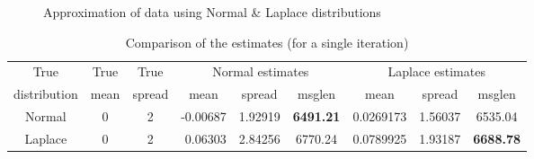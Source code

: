 \documentclass[wcp]{jmlr}
\begin{document}
\begin{figure}[!htb]
  \centering
    \hspace{0.5cm}
    \caption{Approximation of data using Normal \& Laplace distributions}
    \label{fig:data_approximation}
\end{figure}

\begin{table}[h]
\centering
\caption{Comparison of the estimates (for a single iteration)}
\label{tab:comparison_estimates}
\begin{tabular}{|c|c|c|c|c|c|c|c|c|}
\hline
True & True & True & \multicolumn{3}{c|}{Normal estimates} & \multicolumn{3}{c|}{Laplace estimates} \\ \cline{4-9} 
distribution & mean & spread & mean & spread & msglen & mean & spread & msglen \\ \hline 
Normal & 0 & 2 & \multicolumn{1}{|r|}{-0.00687} & 1.92919 & \textbf{6491.21} & 0.0269173 & 1.56037 & 6535.04 \\ \hline
Laplace & 0 & 2 & \multicolumn{1}{|r|}{0.06303} & 2.84256 & 6770.24 & 0.0789925 & 1.93187 & \textbf{6688.78} \\ \hline
\end{tabular}
\end{table}
\end{document}
